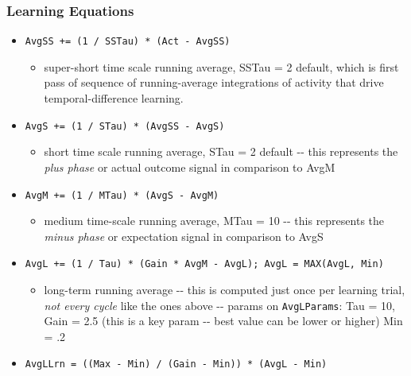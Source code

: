 \documentclass[11pt,twoside]{article}
\newif\myifpdf
\providecommand{\tightlist}{%
  \setlength{\itemsep}{.25in}\setlength{\parskip}{-.25in}}
\begin{document}
\subsubsection{Learning Equations}

\begin{itemize}
	
  \item \texttt{AvgSS\ +=\ (1\ /\ SSTau)\ *\ (Act\ -\ AvgSS)}

    \begin{itemize}
	\tightlist
    \item
      super-short time scale running average, SSTau = 2 default, which is first pass of sequence of running-average integrations of activity that drive temporal-difference learning.
    \end{itemize}
	
  \item \texttt{AvgS\ +=\ (1\ /\ STau)\ *\ (AvgSS\ -\ AvgS)}

    \begin{itemize}
	\tightlist
    \item
      short time scale running average, STau = 2 default -\/- this
      represents the \emph{plus phase} or actual outcome signal in
      comparison to AvgM
    \end{itemize}
	
  \item \texttt{AvgM\ +=\ (1\ /\ MTau)\ *\ (AvgS\ -\ AvgM)}

    \begin{itemize}
	\tightlist
    \item
      medium time-scale running average, MTau = 10 -\/- this represents
      the \emph{minus phase} or expectation signal in comparison to AvgS
    \end{itemize}
	
  \item \texttt{AvgL\ +=\ (1\ /\ Tau)\ *\ (Gain\ *\ AvgM\ -\ AvgL);\ AvgL\ =\ MAX(AvgL,\ Min)}

    \begin{itemize}
	\tightlist
    \item
      long-term running average -\/- this is computed just once per
      learning trial, \emph{not every cycle} like the ones above -\/-
      params on \texttt{AvgLParams}: Tau = 10, Gain = 2.5 (this is a key
      param -\/- best value can be lower or higher) Min = .2
    \end{itemize}
	
  \item \texttt{AvgLLrn\ =\ ((Max\ -\ Min)\ /\ (Gain\ -\ Min))\ *\ (AvgL\ -\ Min)}


\end{itemize}
\end{document}
